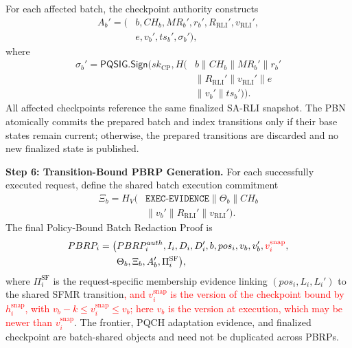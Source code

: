 \documentclass[lettersize,journal]{IEEEtran}
\begin{document}
For each affected batch, the checkpoint authority constructs
\begin{equation}
\begin{aligned}
A_b'=\big(&b,CH_b,MR_b',r_b',
R_{\mathrm{RLI}}',v_{\mathrm{RLI}}',\\
&e,v_b',ts_b',\sigma_b'\big),
\end{aligned}
\end{equation}
where
\begin{equation}
\begin{aligned}
\sigma_b'=
\mathsf{PQSIG.Sign}\big(
sk_{\mathrm{CP}},
H(&b\parallel CH_b\parallel MR_b'\parallel r_b'\\
&\parallel R_{\mathrm{RLI}}'\parallel v_{\mathrm{RLI}}'
\parallel e\\
&\parallel v_b'\parallel ts_b')\big).
\end{aligned}
\end{equation}
All affected checkpoints reference the same finalized SA-RLI snapshot.
The PBN atomically commits the prepared batch and index transitions
only if their base states remain current; otherwise, the prepared
transitions are discarded and no new finalized state is published.

\medskip
\noindent\textbf{Step 6: Transition-Bound PBRP Generation.}
For each successfully executed request, define the shared batch
execution commitment
\begin{equation}
\begin{aligned}
\Xi_b=
H_V\big(&\texttt{EXEC-EVIDENCE}\parallel
\Theta_b\parallel CH_b\\
&\parallel v_b'\parallel
R_{\mathrm{RLI}}'\parallel v_{\mathrm{RLI}}'\big).
\end{aligned}
\end{equation}
The final Policy-Bound Batch Redaction Proof is
\begin{equation}
\begin{aligned}
PBRP_i=\big(
&PBRP_i^{auth},I_i,D_i,D_i',
b,pos_i,v_b,v_b',\textcolor{red}{v_i^{\mathrm{snap}}},\\
&\Theta_b,\Xi_b,A_b',\Pi_i^{\mathrm{SF}}\big),
\end{aligned}
\end{equation}
where $\Pi_i^{\mathrm{SF}}$ is the request-specific membership evidence
linking $(pos_i,L_i,L_i')$ to the shared SFMR transition\textcolor{red}{,
and $v_i^{\mathrm{snap}}$ is the version of the checkpoint bound by
$h_i^{\mathrm{snap}}$, with $v_b-k\le v_i^{\mathrm{snap}}\le v_b$; here
$v_b$ is the version at execution, which may be newer than
$v_i^{\mathrm{snap}}$}. The frontier,
PQCH adaptation evidence, and finalized checkpoint are batch-shared
objects and need not be duplicated across PBRPs.
\end{document}
